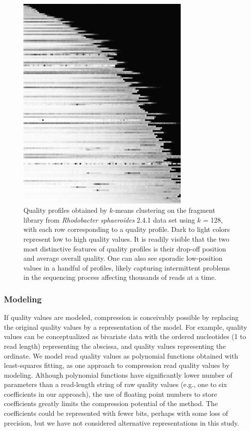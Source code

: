 \documentclass{bioinfo}
\begin{document}
\begin{methods}
\begin{figure}[!tpb]
\centerline{\includegraphics[width=3.35in]{profiles_128.png}}
\caption{Quality profiles obtained by $k$-means clustering on the
  fragment library from \textit{Rhodobacter sphaeroides} 2.4.1 data
  set using $k$ = 128, with each row corresponding to a quality
  profile. Dark to light colors represent low to high quality
  values. It is readily visible that the two most distinctive features
  of quality profiles is their drop-off position and average overall
  quality. One can also see sporadic low-position values in a handful
  of profiles, likely capturing intermittent problems in the
  sequencing process affecting thousands of reads at a
  time.}\label{fig:profiles_128}
\end{figure}

\subsubsection{Modeling}

If quality values are modeled, compression is conceivably possible by
replacing the original quality values by a representation of the
model. For example, quality values can be conceptualized as bivariate
data with the ordered nucleotides (1 to read length) representing the
abscissa, and quality values representing the ordinate. We model read
quality values as polynomial functions obtained with least-squares
fitting, as one approach to compression read quality values by
modeling.  Although polynomial functions have significantly lower
number of parameters than a read-length string of raw quality values
(e.g., one to six coefficients in our approach), the use of floating
point numbers to store coefficients greatly limits the compression
potential of the method. The coefficients could be represented with
fewer bits, perhaps with some loss of precision, but we have not
considered alternative representations in this study.


\end{methods}
\end{document}
